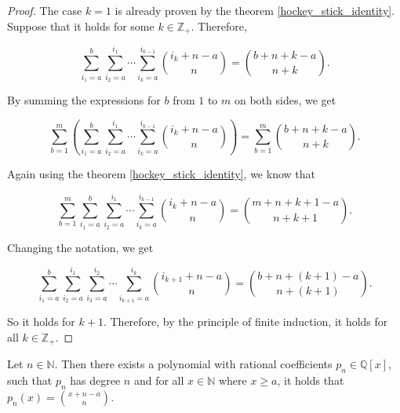 \documentclass[12pt]{article}
\begin{document}
\begin{proof}

    The case $k = 1$ is already proven by the theorem \ref{hockey_stick_identity}. Suppose that it holds for some $k \in \mathbb{Z_+}$. Therefore,

    $$
        \sum_{i_1=a}^{b}\sum_{i_2=a}^{i_1} \cdots \sum_{i_k=a}^{i_{k-1}} \binom{i_k+n-a}{n} = \binom{b+n+k-a}{n+k}.
    $$

    By summing the expressions for $b$ from $1$ to $m$ on both sides, we get

    $$
        \sum_{b=1}^{m} \left( \sum_{i_1=a}^{b}\sum_{i_2=a}^{i_1} \cdots \sum_{i_k=a}^{i_{k-1}} \binom{i_k+n-a}{n} \right) = \sum_{b=1}^{m} \binom{b+n+k-a}{n+k}.
    $$

    Again using the theorem \ref{hockey_stick_identity}, we know that

    $$
        \sum_{b=1}^{m} \sum_{i_1=a}^{b}\sum_{i_2=a}^{i_1} \cdots \sum_{i_k=a}^{i_{k-1}} \binom{i_k+n-a}{n} = \binom{m+n+k+1-a}{n+k+1}.
    $$

    Changing the notation, we get

    $$
        \boxed{\sum_{i_1=a}^{b} \sum_{i_2=a}^{i_1}\sum_{i_3=a}^{i_2} \cdots \sum_{i_{k+1}=a}^{i_k} \binom{i_{k+1}+n-a}{n} = \binom{b+n+(k+1)-a}{n+(k+1)}}.
    $$

    So it holds for $k+1$. Therefore, by the principle of finite induction, it holds for all $k \in \mathbb{Z_+}$.

\end{proof}

\vspace{20px}

\begin{lemma}
    \label{binomial_degree}

    Let $n \in \mathbb{N}$. Then there exists a polynomial with rational coefficients $p_n \in \mathbb Q[x]$, such that $p_n$ has degree $n$ and for all $x\in \mathbb{N}$ where $x \geq a$, it holds that $p_n(x) = \binom{x+n-a}{n}$.

\end{lemma}
\end{document}
